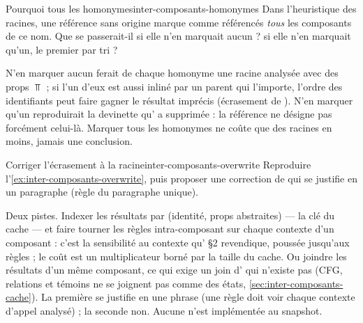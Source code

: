 \begin{exercice}{Pourquoi tous les homonymes}{inter-composants-homonymes}
Dans l'heuristique des racines, une référence sans origine marque comme référencés
\emph{tous} les composants de ce nom. Que se passerait-il si elle n'en marquait aucun ? si elle
n'en marquait qu'un, le premier par tri ?
\end{exercice}
\begin{solution}
N'en marquer aucun ferait de chaque homonyme une racine analysée avec des props $\Top$ ; si l'un
d'eux est aussi inliné par un parent qui l'importe, l'ordre des identifiants peut faire gagner
le résultat imprécis (écrasement de ). N'en marquer qu'un reproduirait la devinette
qu' a supprimée : la référence ne désigne pas forcément celui-là. Marquer tous les
homonymes ne coûte que des racines en moins, jamais une conclusion.
\end{solution}

\begin{exercice}{Corriger l'écrasement à la racine}{inter-composants-overwrite}
Reproduire l'\cref{ex:inter-composants-overwrite}, puis proposer une correction de
 qui se justifie en un paragraphe (\og règle du paragraphe unique\fg).
\end{exercice}
\begin{solution}
Deux pistes. Indexer les résultats par (identité, props abstraites) --- la clé du cache --- et
faire tourner les règles intra-composant sur chaque contexte d'un composant : c'est la
sensibilité au contexte qu' §2 revendique, poussée jusqu'aux règles ; le coût est un
multiplicateur borné par la taille du cache. Ou joindre les résultats d'un même composant, ce
qui exige un join d' qui n'existe pas (CFG, relations et témoins ne se
joignent pas comme des états, \cref{sec:inter-composants-cache}). La première se justifie en une
phrase (\og une règle doit voir chaque contexte d'appel analysé\fg) ; la seconde non. Aucune n'est
implémentée au snapshot.
\end{solution}

